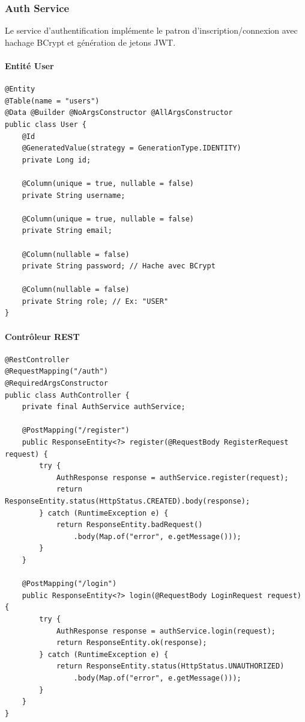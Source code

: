 \documentclass[12pt,a4paper]{article}
\begin{document}
\subsubsection{Auth Service}

Le service d'authentification implémente le patron d'inscription/connexion avec hachage BCrypt et génération de jetons JWT.

\paragraph{Entité User}

\begin{lstlisting}[style=javastyle, caption={User.java --- Entité JPA représentant un utilisateur}, label=lst:user]
@Entity
@Table(name = "users")
@Data @Builder @NoArgsConstructor @AllArgsConstructor
public class User {
    @Id
    @GeneratedValue(strategy = GenerationType.IDENTITY)
    private Long id;

    @Column(unique = true, nullable = false)
    private String username;

    @Column(unique = true, nullable = false)
    private String email;

    @Column(nullable = false)
    private String password; // Hache avec BCrypt

    @Column(nullable = false)
    private String role; // Ex: "USER"
}
\end{lstlisting}

\paragraph{Contrôleur REST}

\begin{lstlisting}[style=javastyle, caption={AuthController.java --- Endpoints REST d'authentification}, label=lst:authctrl]
@RestController
@RequestMapping("/auth")
@RequiredArgsConstructor
public class AuthController {
    private final AuthService authService;

    @PostMapping("/register")
    public ResponseEntity<?> register(@RequestBody RegisterRequest request) {
        try {
            AuthResponse response = authService.register(request);
            return ResponseEntity.status(HttpStatus.CREATED).body(response);
        } catch (RuntimeException e) {
            return ResponseEntity.badRequest()
                .body(Map.of("error", e.getMessage()));
        }
    }

    @PostMapping("/login")
    public ResponseEntity<?> login(@RequestBody LoginRequest request) {
        try {
            AuthResponse response = authService.login(request);
            return ResponseEntity.ok(response);
        } catch (RuntimeException e) {
            return ResponseEntity.status(HttpStatus.UNAUTHORIZED)
                .body(Map.of("error", e.getMessage()));
        }
    }
}
\end{lstlisting}
\end{document}
